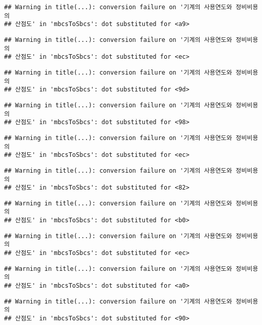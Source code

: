 \documentclass[
]{article}
\begin{document}
\begin{verbatim}
## Warning in title(...): conversion failure on '기계의 사용연도와 정비비용의
## 산점도' in 'mbcsToSbcs': dot substituted for <a9>
\end{verbatim}

\begin{verbatim}
## Warning in title(...): conversion failure on '기계의 사용연도와 정비비용의
## 산점도' in 'mbcsToSbcs': dot substituted for <ec>
\end{verbatim}

\begin{verbatim}
## Warning in title(...): conversion failure on '기계의 사용연도와 정비비용의
## 산점도' in 'mbcsToSbcs': dot substituted for <9d>
\end{verbatim}

\begin{verbatim}
## Warning in title(...): conversion failure on '기계의 사용연도와 정비비용의
## 산점도' in 'mbcsToSbcs': dot substituted for <98>
\end{verbatim}

\begin{verbatim}
## Warning in title(...): conversion failure on '기계의 사용연도와 정비비용의
## 산점도' in 'mbcsToSbcs': dot substituted for <ec>
\end{verbatim}

\begin{verbatim}
## Warning in title(...): conversion failure on '기계의 사용연도와 정비비용의
## 산점도' in 'mbcsToSbcs': dot substituted for <82>
\end{verbatim}

\begin{verbatim}
## Warning in title(...): conversion failure on '기계의 사용연도와 정비비용의
## 산점도' in 'mbcsToSbcs': dot substituted for <b0>
\end{verbatim}

\begin{verbatim}
## Warning in title(...): conversion failure on '기계의 사용연도와 정비비용의
## 산점도' in 'mbcsToSbcs': dot substituted for <ec>
\end{verbatim}

\begin{verbatim}
## Warning in title(...): conversion failure on '기계의 사용연도와 정비비용의
## 산점도' in 'mbcsToSbcs': dot substituted for <a0>
\end{verbatim}

\begin{verbatim}
## Warning in title(...): conversion failure on '기계의 사용연도와 정비비용의
## 산점도' in 'mbcsToSbcs': dot substituted for <90>
\end{verbatim}
\end{document}

